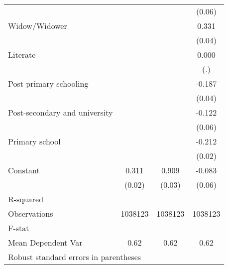 {\begin{tabular}{l*{3}{c}}
                    &                     &                     &      (0.06)         \\
Widow/Widower       &                     &                     &       0.331\sym{***}\\
                    &                     &                     &      (0.04)         \\
Literate            &                     &                     &       0.000         \\
                    &                     &                     &         (.)         \\
Post primary schooling&                     &                     &      -0.187\sym{***}\\
                    &                     &                     &      (0.04)         \\
Post-secondary and university&                     &                     &      -0.122\sym{*}  \\
                    &                     &                     &      (0.06)         \\
Primary school      &                     &                     &      -0.212\sym{***}\\
                    &                     &                     &      (0.02)         \\
Constant            &       0.311\sym{***}&       0.909\sym{***}&      -0.083         \\
                    &      (0.02)         &      (0.03)         &      (0.06)         \\
\hline
R-squared           &                     &                     &                     \\
Observations        &     1038123         &     1038123         &     1038123         \\
F-stat              &                     &                     &                     \\
Mean Dependent Var  &        0.62         &        0.62         &        0.62         \\
\hline\hline
\multicolumn{4}{l}{\footnotesize Robust standard errors in parentheses}\\
\end{tabular}
}
